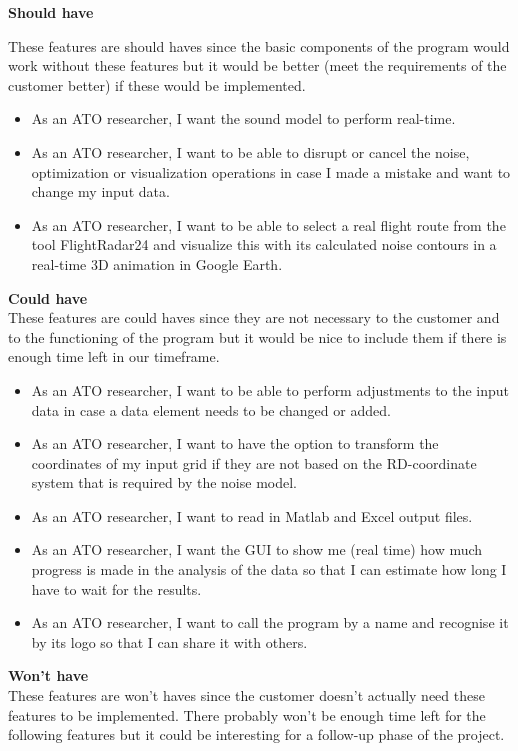 \newpage

\textbf{Should have}

These features are should haves since the basic components of the program would work without these features but it would be better (meet the requirements of the customer better) if these would be implemented. 

\begin{itemize}
\item As an ATO researcher, I want the sound model to perform real-time.
\item As an ATO researcher, I want to be able to disrupt or cancel the noise, optimization or visualization operations in case I made a mistake and want to change my input data.
\item As an ATO researcher, I want to be able to select a real flight route from the tool FlightRadar24 and visualize this with its calculated noise contours in a real-time 3D animation in Google Earth.
\end{itemize}

\textbf{Could have} \\
These features are could haves since they are not necessary to the customer and to the functioning of the program but it would be nice to include them if there is enough time left in our timeframe. 

\begin{itemize}
\item As an ATO researcher, I want to be able to perform adjustments to the input data in case a data element needs to be changed or added. 
\item As an ATO researcher, I want to have the option to transform the coordinates of my input grid if they are not based on the RD-coordinate system that is required by the noise model.
\item As an ATO researcher, I want to read in Matlab and Excel output files.
\item As an ATO researcher, I want the GUI to show me (real time) how much progress is made in the analysis of the data so that I can estimate how long I have to wait for the results.
\item As an ATO researcher, I want to call the program by a name and recognise it by its logo so that I can share it with others.
\end{itemize}

\textbf{Won't have} \\
These features are won't haves since the customer doesn't actually need these features to be implemented. There probably won't be enough time left for the following features but it could be interesting for a follow-up phase of the project. 

